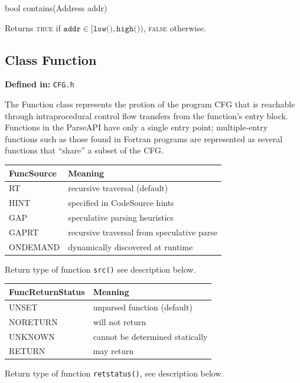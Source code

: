 \documentclass{article}
\newenvironment{apient}{\small\verbatim}{\endverbatim}
\newcommand{\apidesc}[1]{%
{\addtolength{\leftskip}{4em}%
#1\par\medskip}
}
\newcommand{\definedin}[1]{%
\textbf{Defined in:} \texttt{#1}
}
\begin{document}
\begin{apient}
bool contains(Address addr)
\end{apient}
\apidesc{Returns {\scshape true} if $\texttt{addr} \in [\texttt{low()},\texttt{high()})$, {\scshape false} otherwise.}

\subsection{Class Function}

\definedin{CFG.h}

The Function class represents the protion of the program CFG that is reachable through intraprocedural control flow transfers from the function's entry block. Functions in the ParseAPI have only a single entry point; multiple-entry functions such as those found in Fortran programs are represented as several functions that ``share'' a subset of the CFG. 

\begin{center}
\begin{tabular}{ll}
\toprule
FuncSource & Meaning \\
\midrule
RT & recursive traversal (default) \\
HINT & specified in CodeSource hints \\
GAP & speculative parsing heuristics \\
GAPRT & recursive traversal from speculative parse \\
ONDEMAND & dynamically discovered at runtime \\
\bottomrule
\end{tabular}
\end{center}

\apidesc{Return type of function \texttt{src()} see description below.}

\begin{center}
\begin{tabular}{ll}
\toprule
FuncReturnStatus & Meaning \\
\midrule
UNSET & unparsed function (default) \\
NORETURN & will not return \\
UNKNOWN & cannot be determined statically \\
RETURN & may return \\
\bottomrule
\end{tabular}
\end{center}

\apidesc{Return type of function \texttt{retstatus()}, see description below.}
\end{document}
